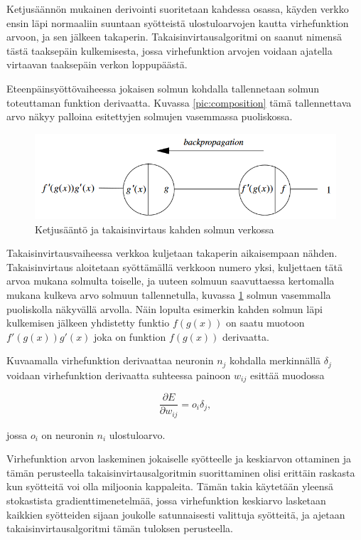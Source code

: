 \documentclass[finnish]{tktltiki2}
\theoremstyle{definition}
\theoremstyle{remark}
\begin{document}
  Ketjusäännön mukainen derivointi suoritetaan kahdessa osassa, käyden verkko ensin läpi normaaliin suuntaan syötteistä ulostuloarvojen kautta virhefunktion arvoon, ja sen jälkeen takaperin. Takaisinvirtausalgoritmi on saanut nimensä tästä taaksepäin kulkemisesta, jossa virhefunktion arvojen voidaan ajatella virtaavan taaksepäin verkon loppupäästä.
  
  Eteenpäinsyöttövaiheessa jokaisen solmun kohdalla tallennetaan solmun toteuttaman funktion derivaatta. Kuvassa \ref{pic:composition} tämä tallennettava arvo näkyy palloina esitettyjen solmujen vasemmassa puoliskossa.

  \begin{figure}[h]
    \label{pic:backpropagation}
    \centering
    \includegraphics[scale=0.5]{backpropagation}
    \caption{Ketjusääntö ja takaisinvirtaus kahden solmun verkossa \cite{Rojas96}}
  \end{figure}

  Takaisinvirtausvaiheessa verkkoa kuljetaan takaperin aikaisempaan nähden. Takaisinvirtaus aloitetaan syöttämällä verkkoon numero yksi, kuljettaen tätä arvoa mukana solmulta toiselle, ja uuteen solmuun saavuttaessa kertomalla mukana kulkeva arvo solmuun tallennetulla, kuvassa \ref{pic:backpropagation} solmun vasemmalla puoliskolla näkyvällä arvolla. Näin lopulta esimerkin kahden solmun läpi kulkemisen jälkeen yhdistetty funktio $f(g(x))$ on saatu muotoon $f'(g(x))g'(x)$ joka on funktion $f(g(x))$ derivaatta. 

  Kuvaamalla virhefunktion derivaattaa neuronin $n_j$ kohdalla merkinnällä $\delta_j$ voidaan virhefunktion derivaatta suhteessa painoon $w_{ij}$ esittää muodossa 

    $$ \frac{\partial E}{\partial w_{ij}} = o_i\delta_j,$$

  jossa $o_i$ on neuronin $n_i$ ulostuloarvo.

  Virhefunktion arvon laskeminen jokaiselle syötteelle ja keskiarvon ottaminen ja tämän perusteella takaisinvirtausalgoritmin suorittaminen olisi erittäin raskasta kun syötteitä voi olla miljoonia kappaleita. Tämän takia käytetään yleensä stokastista gradienttimenetelmää, jossa virhefunktion keskiarvo lasketaan kaikkien syötteiden sijaan joukolle satunnaisesti valittuja syötteitä, ja ajetaan takaisinvirtausalgoritmi tämän tuloksen perusteella.
\end{document}
